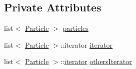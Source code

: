 \subsection*{Private Attributes}
\begin{DoxyCompactItemize}
\item 
list$<$ \hyperlink{classParticle}{Particle} $>$ \hyperlink{classParticleContainer_a2a64265094e9b6d7731d9e86b56e950a}{particles}
\item 
list$<$ \hyperlink{classParticle}{Particle} $>$\+::iterator \hyperlink{classParticleContainer_a95197b7951a740a84c988c6981f90eb9}{iterator}
\item 
list$<$ \hyperlink{classParticle}{Particle} $>$\+::\hyperlink{classParticleContainer_a95197b7951a740a84c988c6981f90eb9}{iterator} \hyperlink{classParticleContainer_a1468b3eecb365425a476eb6b81e99857}{others\+Iterator}
\end{DoxyCompactItemize}


